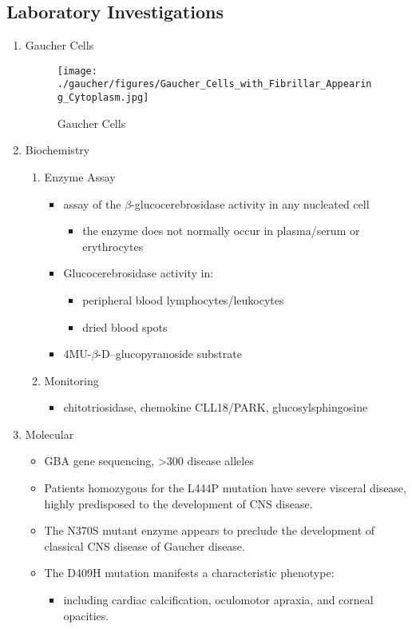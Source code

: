 \documentclass{scrartcl}
\begin{document}
\subsection{Laboratory Investigations}
\label{sec:orgee875d1}
\begin{enumerate}
\item Gaucher Cells
\label{sec:org38995ef}

\begin{figure}[htbp]
\centering
\texttt{[image: ./gaucher/figures/Gaucher\_Cells\_with\_Fibrillar\_Appearing\_Cytoplasm.jpg]}
\caption{\label{fig:orgea60c0f}
Gaucher Cells}
\end{figure}

\item Biochemistry
\label{sec:orgf573e4b}
\begin{enumerate}
\item Enzyme Assay
\label{sec:org4abeb98}
\begin{itemize}
\item assay of the \(\beta\)-glucocerebrosidase activity in any nucleated cell
\begin{itemize}
\item the enzyme does not normally occur in plasma/serum or erythrocytes
\end{itemize}
\item Glucocerebrosidase activity in:
\begin{itemize}
\item peripheral blood lymphocytes/leukocytes
\item dried blood spots
\end{itemize}
\item 4MU-\(\beta\)-D--glucopyranoside substrate
\end{itemize}

\item Monitoring
\label{sec:org56ebb19}
\begin{itemize}
\item chitotriosidase, chemokine CLL18/PARK, glucosylsphingosine
\end{itemize}
\end{enumerate}

\item Molecular
\label{sec:orgb1ce635}

\begin{itemize}
\item GBA gene sequencing, >300 disease alleles
\item Patients homozygous for the L444P mutation have severe visceral
disease, highly predisposed to the development of CNS disease.
\item The N370S mutant enzyme appears to preclude the development of classical CNS disease of Gaucher disease.
\item The D409H mutation manifests a characteristic phenotype:
\begin{itemize}
\item including cardiac calcification, oculomotor apraxia, and corneal opacities.
\end{itemize}
\end{itemize}
\end{enumerate}
\end{document}
